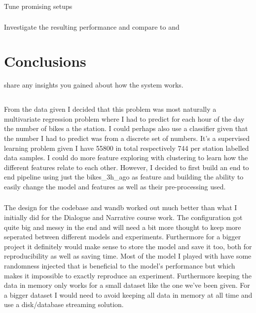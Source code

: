 \documentclass[a4paper]{article}
\begin{document}
    \subsubsection*{} Tune promising setups
    \subsubsection*{} Investigate the resulting performance and compare to  and 


    \section{Conclusions}\label{sec:conclusions}
    share any insights you gained about how the system works.

    \subsection*{}
    \subsubsection*{}
    From the data given I decided that this problem was most naturally a multivariate regression problem where I had to
    predict for each hour of the day the number of bikes a the station. I could perhaps also use a classifier given that
    the number I had to predict was from a discrete set of numbers. It's a supervised learning problem given I have 55800
    in total respectively 744 per station labelled data samples. I could do more feature exploring with clustering to
    learn how the different features relate to each other. However, I decided to first build an end to end pipeline using
    just the bikes\_3h\_ago as feature and building the ability to easily change the model and features as well as their
    pre-processing used.

    \subsubsection*{}
    The design for the codebase and wandb worked out much better than what I initially did for the Dialogue and Narrative
    course work. The configuration got quite big and messy in the end and will need a bit more thought to
    keep more seperated between different models and experiments. Furthermore for a bigger project it definitely would
    make sense to store the model and save it too, both for
    reproducibility as well as saving time. Most of the model I played with have some randomness injected that is
    beneficial to the model's performance but which makes it impossible to exactly reproduce an experiment. Furthermore
    keeping the data in memory only works for a small dataset like the one we've been given. For a bigger dataset I
    would need to avoid keeping all data in memory at all time and use a disk/database streaming solution.
\end{document}
